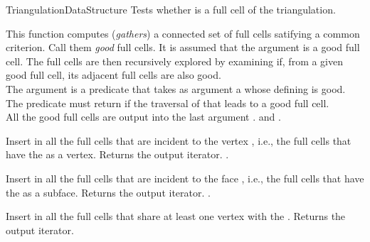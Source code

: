 \begin{ccRefConcept}{TriangulationDataStructure}
{Tests whether  is a full cell of the triangulation.}

{This function computes (\emph{gathers}) a connected set of full cells
satifying a common criterion. Call them \emph{good} full cells. It is assumed
that the argument  is a good full cell. The full cells are then
recursively explored by examining if, from a given good full cell, its adjacent
full cells are also good.\\
The argument  is a predicate that takes as argument a 
whose defining  is good. The predicate must return 
if the traversal of that  leads to a good full cell.\\
All the good full cells are output into the last argument .
\ccPrecond {} and .
}

{Insert in  all the full cells that are incident to the vertex
, {i.e.}, the full cells that have the  as a vertex.
Returns the output iterator.
\ccPrecond {}.
}

{Insert in  all the full cells that are incident to the face ,
{i.e.}, the full cells that have the  as a subface.
Returns the output iterator.
\ccPrecond{}.
}

{Insert in  all the full cells that share at least one vertex with the . Returns the output iterator.
}




\end{ccRefConcept}

